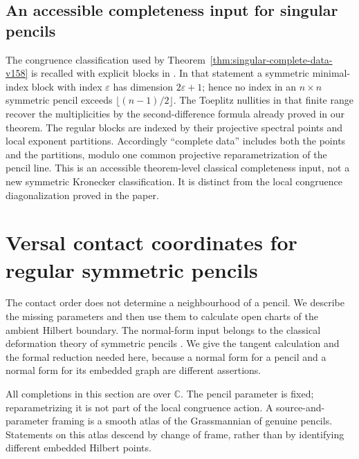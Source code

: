 \documentclass[11pt,reqno]{amsart}
\numberwithin{equation}{section}
\theoremstyle{definition}\newtheorem{definition}[theorem]{Definition}
\theoremstyle{remark}\newtheorem{remark}[theorem]{Remark}
\newcommand{\C}{\mathbb C}\newcommand{\Q}{\mathbb Q}
\begin{document}
\subsection{An accessible completeness input for singular pencils}
The congruence classification used by
Theorem~\ref{thm:singular-complete-data-v158} is recalled with explicit
blocks in \cite[Theorem~2.1]{DeTeranDmytryshynDopico2018v161}.
In that statement a symmetric minimal-index block with index
$\varepsilon$ has dimension $2\varepsilon+1$; hence no index in an
$n\times n$ symmetric pencil exceeds $\lfloor(n-1)/2\rfloor$.
The Toeplitz nullities in that finite range recover the
multiplicities by the second-difference formula already proved in
our theorem. The regular blocks are indexed by their projective
spectral points and local exponent partitions. Accordingly
``complete data'' includes both the points and the partitions,
modulo one common projective reparametrization of the pencil line.
This is an accessible theorem-level classical completeness input,
not a new symmetric Kronecker classification. It is distinct from
the local congruence diagonalization proved in the paper.

\section{Versal contact coordinates for regular symmetric pencils}
\label{sec:versal-contacts-v162}
The contact order does not determine a neighbourhood of a pencil.
We describe the missing parameters and then use them to calculate
open charts of the ambient Hilbert boundary. The normal-form input
belongs to the classical deformation theory of symmetric pencils
\cite[Theorem~2.1, Corollary~2.1 and Lemma~3.1]{Dmytryshyn162}.
We give the tangent calculation and the formal reduction needed here,
because a normal form for a pencil and a normal form for its embedded
graph are different assertions.

All completions in this section are over $\C$. The pencil parameter
is fixed; reparametrizing it is not part of the local congruence action.
A source-and-parameter framing is a smooth atlas of the Grassmannian
of genuine pencils. Statements on this atlas descend by change of
frame, rather than by identifying different embedded Hilbert points.
\end{document}
